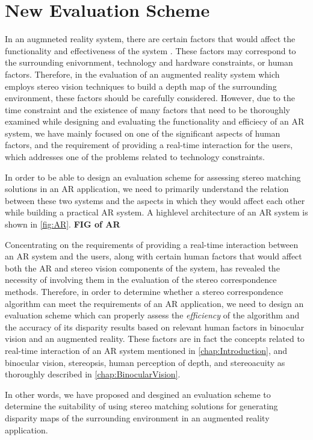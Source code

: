 \section{New Evaluation Scheme}

In an augmneted reality system, there are certain factors that would affect the functionality and effectiveness of the system \cite{dras96,liv05}. These factors may correspond to the surrounding 
enivornment, technology and hardware constraints, or human factors. Therefore, in the evaluation of an augmented reality system 
which employs stereo vision techniques to build a depth map of the surrounding environment, these factors should be carefully considered. 
However, due to the time constraint and the existence of many factors that need to be thoroughly 
examined while designing and evaluating the functionality and efficiecy of an AR system, we have mainly focused on one of the significant aspects of human factors, 
and the requirement of providing a real-time interaction for
the users, which addresses one of the problems related to technology constraints. 

In order to be able to design an evaluation scheme for assessing stereo matching solutions in an AR application, we need to primarily understand the relation between these two systems and
the aspects in which they would affect each other while building a practical AR system. A highlevel architecture of an AR system is shown in \ref{fig:AR}.
\textbf{FIG of AR}

Concentrating on the requirements of providing a real-time interaction between an AR system and the users, along with
certain human factors that would affect both the AR and stereo vision components of the system,
has revealed the necessity of involving them in the evaluation of the stereo correspondence methods. Therefore, in order to 
determine whether a stereo correspondence algorithm can meet the requirements of an AR application, we need to design an evaluation scheme which can properly assess 
the \textit{efficiency} of the algorithm and the accuracy of its disparity results based on relevant human factors in binocular vision and an augmented reality.
These factors are in fact the concepts related to real-time interaction of an AR system mentioned in \ref{chap:Introduction}, and binocular vision, stereopsis, human perception of depth, 
and stereoacuity as thoroughly described in \ref{chap:BinocularVision}.

In other words, we have proposed and desgined an evaluation scheme to determine the suitability of using stereo matching solutions for generating disparity maps of the surrounding 
environment in an augmented reality application. 

